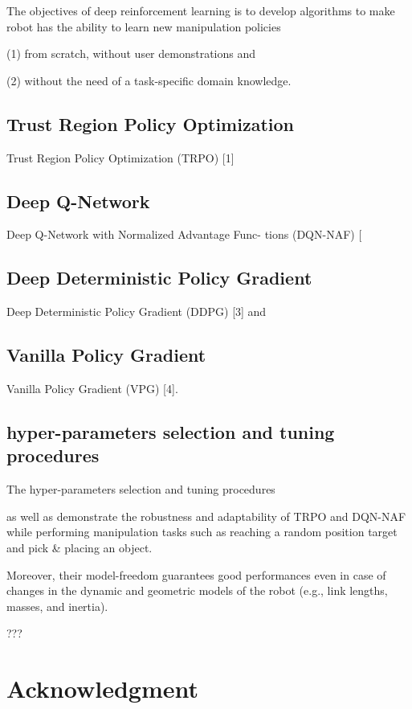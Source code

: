 \documentclass[conference]{IEEEtran}
\begin{document}
The objectives of deep reinforcement learning is to 
develop algorithms to make robot has the ability to learn new 
manipulation policies 

(1) from scratch, without user
demonstrations and 

(2) without the need of a task-specific 
domain knowledge. 
 
\subsection{Trust Region Policy Optimization} 
Trust Region Policy Optimization (TRPO) [1]
 

\subsection{Deep Q-Network} 
 Deep Q-Network with Normalized Advantage Func-
tions (DQN-NAF) [ 


\subsection{Deep Deterministic Policy Gradient} 
Deep Deterministic Policy Gradient
(DDPG) [3] and 


\subsection{Vanilla Policy Gradient} 

Vanilla Policy Gradient (VPG) [4].  


\subsection{hyper-parameters selection and tuning procedures} 

The hyper-parameters selection and
tuning procedures



 as well as demonstrate the robustness
and adaptability of TRPO and DQN-NAF while performing
manipulation tasks such as reaching a random position target
and pick \& placing an object. 






 Moreover, their model-freedom guarantees
good performances even in case of changes in the dynamic
and geometric models of the robot (e.g., link lengths, masses,
and inertia).
 
 ???

   
\section*{Acknowledgment}
\end{document}
